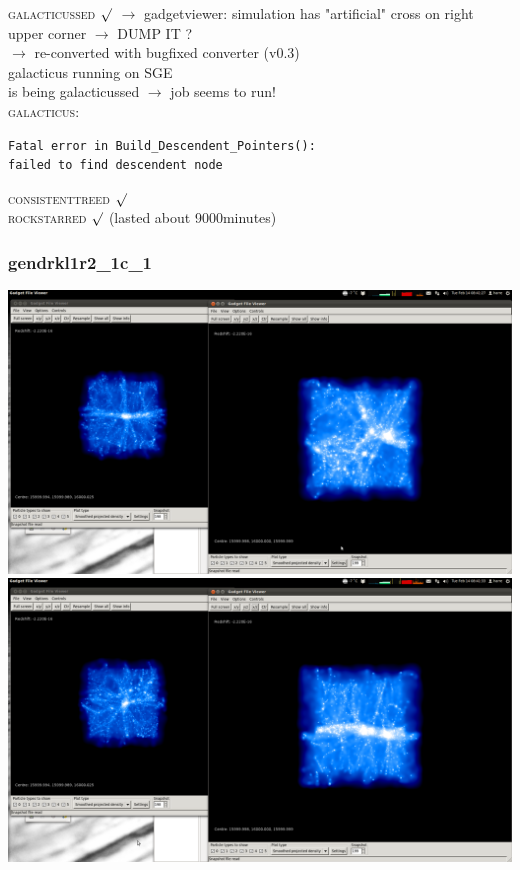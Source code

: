 \textsc{galacticussed} $\surd$
$\rightarrow$ gadgetviewer: simulation has "artificial" cross on right upper corner $\rightarrow$ DUMP IT ? \\
$\rightarrow$ re-converted with bugfixed converter (v0.3) \\
galacticus running on SGE \\
is being galacticussed $\rightarrow$ job seems to run! \\
 \textsc{galacticus}:
 \begin{verbatim}
Fatal error in Build_Descendent_Pointers():
failed to find descendent node 
\end{verbatim}
\textsc{consistenttreed} $\surd$ \\ 
\textsc{rockstarred} $\surd$ (lasted about 9000minutes) \\

% 
%
%
%
%
%
%
%



\newpage
\subsubsection{gendrkl1r2\_1c\_1}

\includegraphics[scale=0.2]{r256/h100/gendrkl1r2_1c_1/1.png} \\
\includegraphics[scale=0.2]{r256/h100/gendrkl1r2_1c_1/2.png} 

